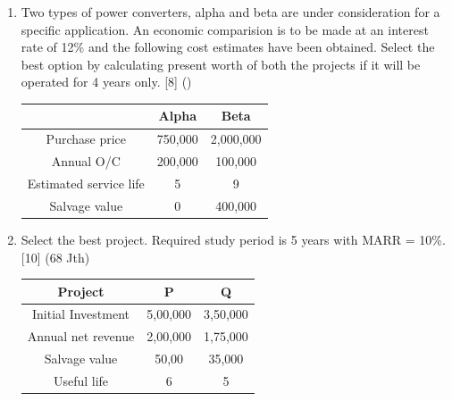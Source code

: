 \documentclass[12pt]{article}
\begin{document}
\begin{enumerate}[noitemsep, topsep = 0pt]
		\item Two types of power converters, alpha and beta are under consideration for a specific application. An economic comparision is to be made at an interest rate of 12\% and the following cost estimates have been obtained. Select the best option by calculating present worth of both the projects if it will be operated for 4 years only. \hfill [8] ()\\
		\begin{tabular}{|c|c|c|}
			\hline
			& Alpha & Beta \\ \hline
			Purchase price & 750,000 & 2,000,000 \\ \hline
			Annual O/C & 200,000 & 100,000 \\ \hline
			Estimated service life & 5 & 9 \\ \hline
			Salvage value & 0 & 400,000 \\ \hline
		\end{tabular}
		
		\item Select the best project. Required study period is 5 years with MARR = 10\%. \hfill [10] (68 Jth)
		\begin{tabular}{|c|c|c|}
			\hline
			Project & P & Q \\ \hline
			Initial Investment & 5,00,000 & 3,50,000 \\ \hline
			Annual net revenue & 2,00,000 & 1,75,000 \\ \hline
			Salvage value & 50,00 & 35,000 \\ \hline
			Useful life & 6 & 5 \\ \hline
		\end{tabular}
	\end{enumerate}
	
\end{document}
